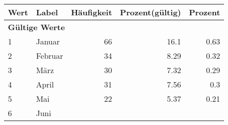      \begin{longtable}{lXrrr}
     \toprule
     \textbf{Wert} & \textbf{Label} & \textbf{Häufigkeit} & \textbf{Prozent(gültig)} & \textbf{Prozent} \\
     \endhead
     \midrule
     \multicolumn{5}{l}{\textbf{Gültige Werte}}\\

     1 &
     \multicolumn{1}{X}{ Januar   } &


       \num{66} &
       \num[round-mode=places,round-precision=2]{16.1} &
         \num[round-mode=places,round-precision=2]{0.63} \\

     2 &
     \multicolumn{1}{X}{ Februar   } &


       \num{34} &
       \num[round-mode=places,round-precision=2]{8.29} &
         \num[round-mode=places,round-precision=2]{0.32} \\

     3 &
     \multicolumn{1}{X}{ März   } &


       \num{30} &
       \num[round-mode=places,round-precision=2]{7.32} &
         \num[round-mode=places,round-precision=2]{0.29} \\

     4 &
     \multicolumn{1}{X}{ April   } &


       \num{31} &
       \num[round-mode=places,round-precision=2]{7.56} &
         \num[round-mode=places,round-precision=2]{0.3} \\

     5 &
     \multicolumn{1}{X}{ Mai   } &


       \num{22} &
       \num[round-mode=places,round-precision=2]{5.37} &
         \num[round-mode=places,round-precision=2]{0.21} \\

     6 &
     \multicolumn{1}{X}{ Juni   } &



\end{longtable}
